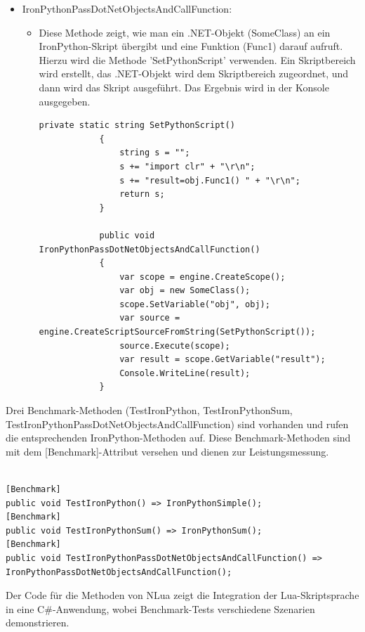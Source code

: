 \begin{itemize}
\begin{itemize}
\begin{lstlisting}[language={[Sharp]C}, caption=IronPythonSum, label=lst:imp:ipySum]
        public void IronPythonSum()
        {
            var scope = engine.CreateScope();
            var source = engine.CreateScriptSourceFromString("def sum(x,y):\r\n\treturn x+y\n\r\n\r\rresult = sum(3,3)");
            source.Execute(scope);
            var result = scope.GetVariable("result");
            Console.WriteLine(result);
        }
        \end{lstlisting}
    \end{itemize}
    \newpage
    \item IronPythonPassDotNetObjectsAndCallFunction:
    \begin{itemize}
        \item Diese Methode zeigt, wie man ein .NET-Objekt (SomeClass) an ein IronPython-Skript übergibt und eine Funktion (Func1) darauf aufruft.
        Hierzu wird die Methode 'SetPythonScript' verwenden.
        Ein Skriptbereich wird erstellt, das .NET-Objekt wird dem Skriptbereich zugeordnet, und dann wird das Skript ausgeführt. Das Ergebnis wird in der Konsole ausgegeben.
        \begin{lstlisting}[language={[Sharp]C}, caption=IronPythonObject, label=lst:imp:ipyObject]
            private static string SetPythonScript()
            {
                string s = "";
                s += "import clr" + "\r\n";
                s += "result=obj.Func1() " + "\r\n";
                return s;
            }

            public void IronPythonPassDotNetObjectsAndCallFunction() 
            {
                var scope = engine.CreateScope();
                var obj = new SomeClass();
                scope.SetVariable("obj", obj);
                var source = engine.CreateScriptSourceFromString(SetPythonScript());
                source.Execute(scope);
                var result = scope.GetVariable("result");
                Console.WriteLine(result);
            }
        \end{lstlisting}
        
    \end{itemize}
\end{itemize}
\newpage
Drei Benchmark-Methoden (TestIronPython, TestIronPythonSum, TestIronPythonPassDotNetObjectsAndCallFunction) sind vorhanden und rufen die entsprechenden IronPython-Methoden auf. Diese Benchmark-Methoden sind mit dem [Benchmark]-Attribut versehen und dienen zur Leistungsmessung.
\begin{lstlisting}[language={[Sharp]C}, caption=IronPythonBenchmark, label=lst:imp:ipyBench]

[Benchmark]
public void TestIronPython() => IronPythonSimple();
[Benchmark]
public void TestIronPythonSum() => IronPythonSum();
[Benchmark]
public void TestIronPythonPassDotNetObjectsAndCallFunction() => IronPythonPassDotNetObjectsAndCallFunction();

\end{lstlisting}
Der Code für die Methoden von NLua zeigt die Integration der Lua-Skriptsprache in eine C\#-Anwendung, wobei Benchmark-Tests verschiedene Szenarien demonstrieren.

